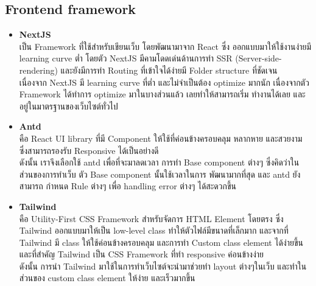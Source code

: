 \documentclass[12pt,oneside,openright,a4paper]{cpe-thai-project}
\begin{document}
\subsection{Frontend framework}
\begin{itemize}
  \item \textbf{NextJS} \\
\hspace*{1cm} เป็น Framework ที่ใช้สำหรับเขียนเว็บ โดยพัฒนามาจาก React ซึ่ง ออกแบบมาให้ใช้งานง่ายมี learning curve ต่ำ โดยตัว NextJS มีคามโดดเด่นด้านการทำ SSR (Server-side-rendering) และยังมีการทำ Routing ที่เข้าใจได้ง่ายมี Folder structure ที่ชัดเจน  \\
\hspace*{1cm} เนื่องจาก NextJS มี learning curve ที่ต่ำ และไม่จำเป็นต้อง optimize มากนัก เนื่องจากตัว Framework ได้ทำการ optimize มาในบางส่วนแล้ว เลยทำให้สามารถเริ่ม ทำงานได้เลย และอยู่ในมาตรฐานของเว็บไซต์ทั่วไป \cite{WhaiIsNextJS}
  \item \textbf{Antd} \\
\hspace*{1cm} คือ React UI library ที่มี  Component ให้ใช้ที่ค่อนข้างครอบคลุม หลากหาย และสวยงาม ซึ่งสามารถรองรับ Responsive ได้เป็นอย่างดี \\
\hspace*{1cm} ดังนั้น เราจึงเลือกใช้ antd เพื่อที่จะมาลดเวลา การทำ Base component ต่างๆ ซึ่งคิดว่าในส่วนของการทำเว็บ ตัว Base component นั้นใช้เวลาในการ พัฒนามากที่สุด และ antd ยังสามารถ กำหนด Rule ต่างๆ เพื่อ handling error ต่างๆ ได้สะดวกขึ้น \cite{WhaiIsAntd}
  \item \textbf{Tailwind} \\
\hspace*{1cm} คือ Utility-First CSS Framework สำหรับจัดการ HTML Element โดยตรง ซึ่ง Tailwind ออกแบบมาให้เป็น low-level class ทำให้ตัวไฟล์มีขนาดที่เล็กมาก และจากที่ Tailwind มี class ให้ใช้ค่อนข้างครอบคลุม และการทำ Custom class element ได้ง่ายขึ้น และที่สำคัญ Tailwind เป็น CSS Framework ที่ทำ responsive ค่อนข้างง่าย \\
\hspace*{1cm} ดังนั้น การนำ Tailwind มาใช้ในการทำเว็บไซต์จะนำมาช่วยทำ layout ต่างๆในเว็บ และทำในส่วนของ custom class element ให้ง่าย และเร็วมากขึ้น \cite{WhaiIsTailwind}
\end{itemize}
\end{document}

